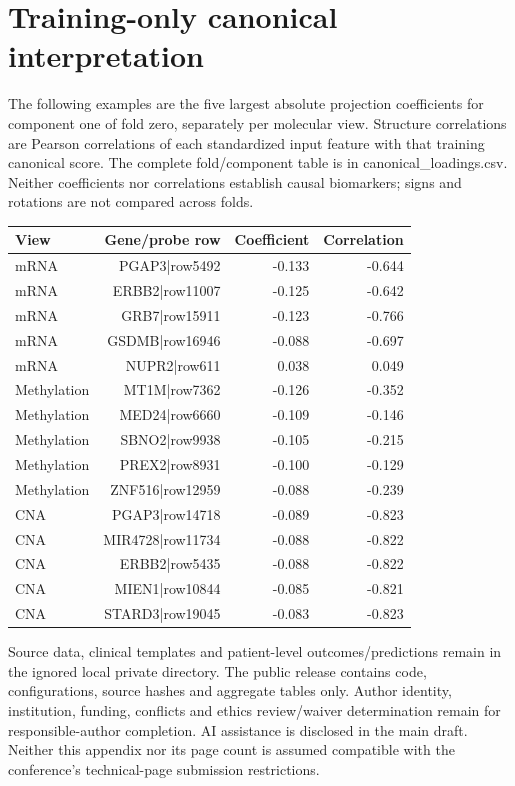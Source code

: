 \documentclass[10pt]{article}
\begin{document}
\section{Training-only canonical interpretation}
The following examples are the five largest absolute projection coefficients for component one of fold zero, separately per molecular view. Structure correlations are Pearson correlations of each standardized input feature with that training canonical score. The complete fold/component table is in canonical\_loadings.csv. Neither coefficients nor correlations establish causal biomarkers; signs and rotations are not compared across folds.
\begin{center}
\footnotesize
\begin{tabular}{lrrr}\hline
View & Gene/probe row & Coefficient & Correlation\\\hline
mRNA & PGAP3|row5492 & -0.133 & -0.644\\
mRNA & ERBB2|row11007 & -0.125 & -0.642\\
mRNA & GRB7|row15911 & -0.123 & -0.766\\
mRNA & GSDMB|row16946 & -0.088 & -0.697\\
mRNA & NUPR2|row611 & 0.038 & 0.049\\
Methylation & MT1M|row7362 & -0.126 & -0.352\\
Methylation & MED24|row6660 & -0.109 & -0.146\\
Methylation & SBNO2|row9938 & -0.105 & -0.215\\
Methylation & PREX2|row8931 & -0.100 & -0.129\\
Methylation & ZNF516|row12959 & -0.088 & -0.239\\
CNA & PGAP3|row14718 & -0.089 & -0.823\\
CNA & MIR4728|row11734 & -0.088 & -0.822\\
CNA & ERBB2|row5435 & -0.088 & -0.822\\
CNA & MIEN1|row10844 & -0.085 & -0.821\\
CNA & STARD3|row19045 & -0.083 & -0.823\\
\hline\end{tabular}
\end{center}
Source data, clinical templates and patient-level outcomes/predictions
remain in the ignored local private directory. The public release contains
code, configurations, source hashes and aggregate tables only. Author identity,
institution, funding, conflicts and ethics review/waiver determination remain
for responsible-author completion. AI assistance is disclosed in the main
draft. Neither this appendix nor its page count is assumed compatible with
the conference's technical-page submission restrictions.
\end{document}
